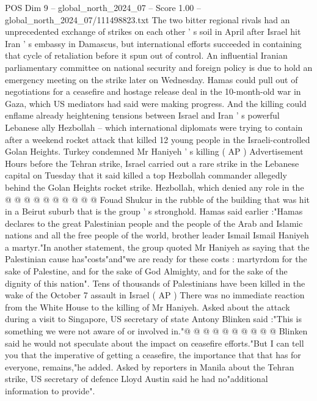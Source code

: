 \begin{textsample}{POS Dim 9 – global\_north\_2024\_07 – Score 1.00 – global\_north\_2024\_07/111498823.txt}  \label{ex:f9_pos_316}
The two bitter regional rivals had an unprecedented exchange of strikes on each other ' s soil in April after Israel hit Iran ' s embassy in Damascus, but international efforts succeeded in containing that cycle of retaliation before it spun out of control.
An influential Iranian parliamentary committee on national security and foreign policy is due to hold an emergency meeting on the strike later on Wednesday.
Hamas could pull out of negotiations for a ceasefire and hostage release deal in the 10-month-old war in Gaza, which US mediators had said were making progress.
And the killing could enflame already heightening tensions between Israel and Iran ' s powerful Lebanese ally Hezbollah -- which international diplomats were trying to contain after a weekend rocket attack that killed 12 young people in the Israeli-controlled Golan Heights.
Turkey condemned Mr Haniyeh ' s killing ( AP ) Advertisement Hours before the Tehran strike, Israel carried out a rare strike in the Lebanese capital on Tuesday that it said killed a top Hezbollah commander allegedly behind the Golan Heights rocket strike.
Hezbollah, which denied any role in the @ @ @ @ @ @ @ @ @ @ Fouad Shukur in the rubble of the building that was hit in a Beirut suburb that is the group ' s stronghold.
Hamas said earlier :"Hamas declares to the great Palestinian people and the people of the Arab and Islamic nations and all the free people of the world, brother leader Ismail Ismail Haniyeh a martyr."In another statement, the group quoted Mr Haniyeh as saying that the Palestinian cause has"costs"and"we are ready for these costs : martyrdom for the sake of Palestine, and for the sake of God Almighty, and for the sake of the dignity of this nation".
Tens of thousands of Palestinians have been killed in the wake of the October 7 assault in Israel ( AP ) There was no immediate reaction from the White House to the killing of Mr Haniyeh.
Asked about the attack during a visit to Singapore, US secretary of state Antony Blinken said :"This is something we were not aware of or involved in."@ @ @ @ @ @ @ @ @ @ Blinken said he would not speculate about the impact on ceasefire efforts."But I can tell you that the imperative of getting a ceasefire, the importance that that has for everyone, remains,"he added.
Asked by reporters in Manila about the Tehran strike, US secretary of defence Lloyd Austin said he had no"additional information to provide".

\end{textsample}
